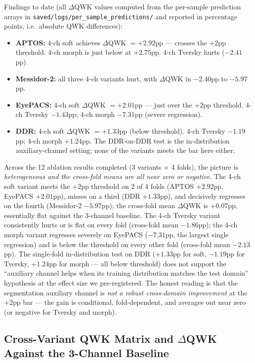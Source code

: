 \documentclass[11pt]{article}
\begin{document}
Findings to date (all $\Delta$QWK values computed from the per-sample prediction arrays in \texttt{saved/logs/per\_sample\_predictions/} and reported in percentage points, i.e.\ absolute QWK differences):
\begin{itemize}[leftmargin=*, topsep=0pt]
  \item \textbf{APTOS:} 4-ch soft achieves $\Delta$QWK $= +2.92$pp --- crosses the $+2$pp threshold. 4-ch morph is just below at $+2.75$pp. 4-ch Tversky hurts ($-2.41$pp).
  \item \textbf{Messidor-2:} all three 4-ch variants hurt, with $\Delta$QWK in $-2.40$pp to $-5.97$pp.
  \item \textbf{EyePACS:} 4-ch soft $\Delta$QWK $= +2.01$pp --- just over the $+2$pp threshold. 4-ch Tversky $-1.43$pp; 4-ch morph $-7.31$pp (severe regression).
  \item \textbf{DDR:} 4-ch soft $\Delta$QWK $= +1.33$pp (below threshold). 4-ch Tversky $-1.19$pp; 4-ch morph $+1.24$pp. The DDR-on-DDR test is the in-distribution auxiliary-channel setting; none of the variants meets the bar here either.
\end{itemize}

Across the 12 ablation results completed (3 variants $\times$ 4 folds), the picture is \emph{heterogeneous and the cross-fold means are all near zero or negative}. The 4-ch soft variant meets the $+2$pp threshold on 2 of 4 folds (APTOS $+2.92$pp, EyePACS $+2.01$pp), misses on a third (DDR $+1.33$pp), and decisively regresses on the fourth (Messidor-2 $-5.97$pp); the cross-fold mean $\Delta$QWK is $+0.07$pp, essentially flat against the 3-channel baseline. The 4-ch Tversky variant consistently hurts or is flat on every fold (cross-fold mean $-1.86$pp); the 4-ch morph variant regresses severely on EyePACS ($-7.31$pp, the largest single regression) and is below the threshold on every other fold (cross-fold mean $-2.13$pp). The single-fold in-distribution test on DDR ($+1.33$pp for soft, $-1.19$pp for Tversky, $+1.24$pp for morph --- all below threshold) does not support the ``auxiliary channel helps when its training distribution matches the test domain'' hypothesis at the effect size we pre-registered. The honest reading is that the segmentation auxiliary channel is \emph{not a robust cross-domain improvement} at the $+2$pp bar --- the gain is conditional, fold-dependent, and averages out near zero (or negative for Tversky and morph).

\subsection{Cross-Variant QWK Matrix and $\Delta$QWK Against the 3-Channel Baseline}
\end{document}
